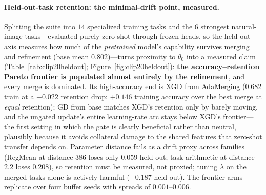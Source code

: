\documentclass{article} %
\begin{document}
\paragraph{Held-out-task retention: the minimal-drift point, measured.}
Splitting the suite into $14$ specialized training tasks and the $6$ strongest natural-image tasks---evaluated purely zero-shot through frozen heads, so the held-out axis measures how much of the \emph{pretrained} model's capability survives merging and refinement (base mean $0.802$)---turns proximity to $\theta_0$ into a measured claim (Table~\ref{tab:clip20heldout}; Figure~\ref{fig:clip20heldout}): \textbf{the accuracy--retention Pareto frontier is populated almost entirely by the refinement}, and every merge is dominated. Its high-accuracy end is XGD from AdaMerging ($0.682$ train at a $-0.022$ retention drop: $+0.146$ training accuracy over the best merge at \emph{equal} retention); GD from base matches XGD's retention only by barely moving, and the ungated update's entire learning-rate arc stays below XGD's frontier---the first setting in which the gate is clearly beneficial rather than neutral, plausibly because it avoids collateral damage to the shared features that zero-shot transfer depends on. Parameter distance fails as a drift proxy across families (RegMean at distance $386$ loses only $0.059$ held-out; task arithmetic at distance $2.2$ loses $0.208$), so retention must be measured, not proxied; tuning $\lambda$ on the merged tasks alone is actively harmful ($-0.187$ held-out). The frontier arms replicate over four buffer seeds with spreads of $0.001$--$0.006$.
\end{document}
